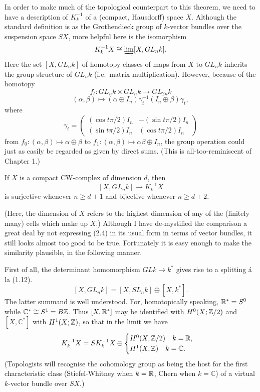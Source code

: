 In order to make much of the topological counterpart to this theorem, we need to have a description of $K_k^{-1}$ of a (compact, Hausdorff) space $X$. Although the standard definition is as the Grothendieck group of $k$-vector bundles over the suspension space $SX$, more helpful here is the isomorphism
\[K_k^{-1} X   \cong \varinjlim [X, GL_n k].\]
Here the set $[X, GL_n k]$ of homotopy  classes of  maps from $X$ to $GL_n k$ inherits the group structure 
of $GL_n k$ (i.e.\  matrix multiplication).  However, because of the homotopy
\[f_t \colon   GL_n k \times  GL_n k\longrightarrow GL_{2n}k\]
\[(\alpha,\beta)\mapsto (\alpha \oplus I_n)\gamma_t^{-1} (I_n\oplus \beta)\gamma_t,\]
where
\begin{equation*}
  \gamma_t =\begin{pmatrix} (\cos t\pi/2)I_n & -(\sin t\pi/2)I_n \\ (\sin t\pi/2)I_n &  (\cos t\pi/2)I_n \end{pmatrix}
\end{equation*}
from $f_0\colon   (\alpha,\beta) \mapsto \alpha\oplus \beta$ to $f_1\colon   (\alpha,\beta)  \mapsto \alpha \beta \oplus I_n$, the group  operation could just as easily be regarded as given by direct sums. (This is all-too-reminiscent of Chapter 1.)
\begin{theorem}
If $X$ is a compact CW-complex of  dimension $d$, then
 \[[X,GL_n k] \longrightarrow  K_k^{-1}X\]
is surjective whenever  $n \geqslant d + 1 $ and bijective whenever $ n \geqslant d+ 2$.
\end{theorem}
(Here, the dimension of  $X$ refers to the highest dimension of any of the (finitely many) cells which make up $X$.) Although I have de-mystified the comparison a great deal by not expressing (2.4) in its usual form in terms of vector bundles, it still looks almost too good to be true. 
Fortunately it is easy enough to make the similarity plausible, in the following manner.

First of all, the determinant homomorphism  $GLk\longrightarrow k^*$ gives rise to a splitting \'{a} la (1.12).
$$[X ,  GL_n k]  =  [ X,SL_n k]\oplus [X,k^*].$$
The latter summand is well understood. For, homotopically speaking, $\mathbb{R}^*=S^0$ while $\mathbb{C}^*\cong S^1=B\mathbb{Z}$. Thus $[X,\mathbb{R}^*]$ may be identified with $H^0(X;\mathbb{Z} /2)$ and $[X,\mathbb{C}^*]$ with $H^1(X;\mathbb{Z})$, so that in the limit we have
\begin{equation}
K_k^{-1}X=SK_k^{-1}X \oplus
  \begin{cases}
H^0(X,\mathbb{Z}/2) \quad k=\mathbb{R}, \\
H^1(X,\mathbb{Z}) \quad k=\mathbb{C}.
\end{cases}
\end{equation}
(Topologists will recognise the cohomology group as being the host for the first characteristic class (Stiefel-Whitney when $k=\mathbb{R}$, Chern when $k=\mathbb{C}$) of a virtual $k$-vector bundle over $SX$.)


